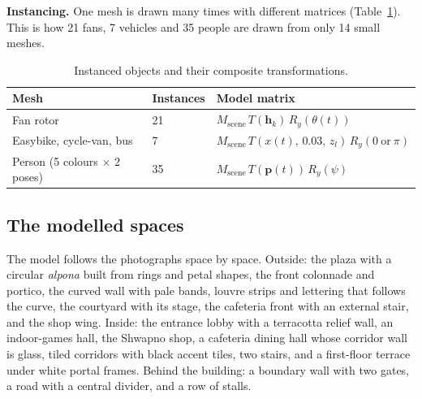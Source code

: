 \documentclass[11pt,a4paper]{article}
\newcommand{\vect}[1]{\mathbf{#1}}
\begin{document}
\textbf{Instancing.} One mesh is drawn many times with different matrices
(Table~\ref{tab:inst}). This is how 21 fans, 7 vehicles and 35 people are
drawn from only 14 small meshes.

\begin{table}[H]
\centering\small
\begin{tabular}{@{}lll@{}}
\toprule
Mesh & Instances & Model matrix \\
\midrule
Fan rotor & 21 & $M_{\mathrm{scene}}\,T(\vect h_k)\,R_y(\theta(t))$ \\
Easybike, cycle-van, bus & 7 & $M_{\mathrm{scene}}\,T(x(t),\,0.03,\,z_l)\,R_y(0\ \text{or}\ \pi)$ \\
Person (5 colours $\times$ 2 poses) & 35 & $M_{\mathrm{scene}}\,T(\vect p(t))\,R_y(\psi)$ \\
\bottomrule
\end{tabular}
\caption{Instanced objects and their composite transformations.}\label{tab:inst}
\end{table}

\subsection{The modelled spaces}
The model follows the photographs space by space. Outside: the plaza with a
circular \emph{alpona} built from rings and petal shapes, the front
colonnade and portico, the curved wall with pale bands, louvre strips and
lettering that follows the curve, the courtyard with its stage, the
cafeteria front with an external stair, and the shop wing. Inside: the
entrance lobby with a terracotta relief wall, an indoor-games hall, the
Shwapno shop, a cafeteria dining hall whose corridor wall is glass, tiled
corridors with black accent tiles, two stairs, and a first-floor terrace
under white portal frames. Behind the building: a boundary wall with two
gates, a road with a central divider, and a row of stalls.
\end{document}
